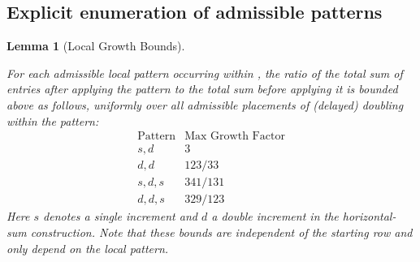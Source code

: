 \documentclass[12pt, oneside]{article}
\numberwithin{equation}{section}
\theoremstyle{definition}
\theoremstyle{plain}
\newtheorem{lemma}[theorem]{Lemma}
\theoremstyle{remark}
\begin{document}
\subsection{Explicit enumeration of admissible patterns}
\begin{lemma}[Local Growth Bounds]
\label{lem:local-growth-bounds}

For each admissible local pattern occurring within ,
the ratio of the total sum of entries after applying the pattern
to the total sum before applying it is bounded above as follows,
uniformly over all admissible placements of (delayed) doubling within
the pattern:
\[
\begin{array}{c|c}
\text{Pattern} & \text{Max Growth Factor} \\
\hline
s,d & 3 \\
d,d & 123/33 \\
s,d,s & 341/131 \\
d,d,s & 329/123
\end{array}
\]
Here $s$ denotes a single increment and $d$ a double increment in the
horizontal-sum construction.  Note that these bounds are independent
of the starting row and only depend on the local pattern.
\end{lemma}
\end{document}
